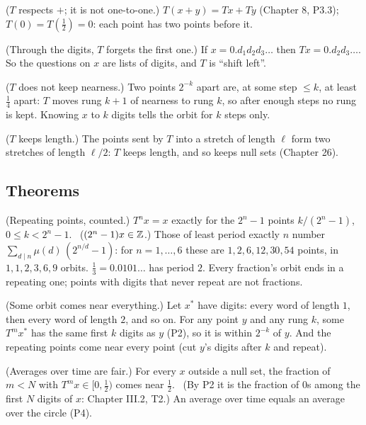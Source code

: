 \begin{lines}
\item[\lab{P1}] ($T$ respects $+$; it is not one-to-one.) $T(x + y) = Tx + Ty$ (Chapter 8, P3.3); $T(0) = T(\tfrac12) = 0$: each point has two points before it.
\item[\lab{P2}] (Through the digits, $T$ forgets the first one.) If $x = 0.d_1 d_2 d_3 \ldots$ then $Tx = 0.d_2 d_3 \ldots$. So the questions on $x$ are lists of digits, and $T$ is ``shift left''.
\item[\lab{P3}] ($T$ does not keep nearness.) Two points $2^{-k}$ apart are, at some step $\le k$, at least $\tfrac14$ apart: $T$ moves rung $k + 1$ of nearness to rung $k$, so after enough steps no rung is kept. Knowing $x$ to $k$ digits tells the orbit for $k$ steps only.
\item[\lab{P4}] ($T$ keeps length.) The points sent by $T$ into a stretch of length $\ell$ form two stretches of length $\ell/2$: $T$ keeps length, and so keeps null sets (Chapter 26).
\end{lines}

\subsection*{Theorems}

\begin{lines}
\item[\lab{T1}] (Repeating points, counted.) $T^n x = x$ exactly for the $2^n - 1$ points $k/(2^n - 1)$, $0 \le k < 2^n - 1$. \ ($(2^n - 1)x \in \mathbb{Z}$.) Those of least period exactly $n$ number $\sum_{d \mid n} \mu(d)\,(2^{n/d} - 1)$: for $n = 1, \dots, 6$ these are $1, 2, 6, 12, 30, 54$ points, in $1, 1, 2, 3, 6, 9$ orbits. $\tfrac13 = 0.0101\ldots$ has period $2$. Every fraction's orbit ends in a repeating one; points with digits that never repeat are not fractions.
\item[\lab{T2}] (Some orbit comes near everything.) Let $x^*$ have digits: every word of length $1$, then every word of length $2$, and so on. For any point $y$ and any rung $k$, some $T^m x^*$ has the same first $k$ digits as $y$ (P2), so it is within $2^{-k}$ of $y$. And the repeating points come near every point (cut $y$'s digits after $k$ and repeat).
\item[\lab{T3}] (Averages over time are fair.) For every $x$ outside a null set, the fraction of $m < N$ with $T^m x \in [0, \tfrac12)$ comes near $\tfrac12$. \ (By P2 it is the fraction of $0$s among the first $N$ digits of $x$: Chapter III.2, T2.) An average over time equals an average over the circle (P4).
\end{lines}

